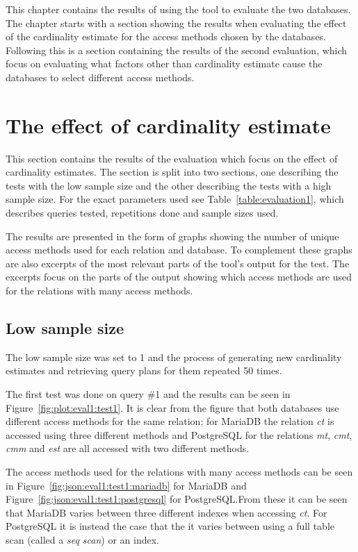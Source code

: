 This chapter contains the results of using the tool to evaluate the two
databases. The chapter starts with a section showing the results when
evaluating the effect of the cardinality estimate for the access methods chosen
by the databases. Following this is a section containing the results of the
second evaluation, which focus on evaluating what factors other than cardinality
estimate cause the databases to select different access methods.

\section{The effect of cardinality estimate}\label{sec:correlation}
This section contains the results of the evaluation which focus on the effect of
cardinality estimates. The section is split into two sections, one describing
the tests with the low sample size and the other describing the tests with a
high sample size. For the exact parameters used see
Table~\ref{table:evaluation1}, which describes queries tested, repetitions done
and sample sizes used.

The results are presented in the form of graphs showing the number of unique
access methods used for each relation and database. To complement these graphs
are also excerpts of the most relevant parts of the tool's output for the test.
The excerpts focus on the parts of the output showing which access methods are
used for the relations with many access methods.

\subsection{Low sample size}
The low sample size was set to 1 and the process of generating new cardinality
estimates and retrieving query plans for them repeated 50 times.

The first test was done on query \#1 and the results can be seen in
Figure~\ref{fig:plot:eval1:test1}. It is clear from the figure that both
databases use different access methods for the same relation; for MariaDB the
relation \textit{ct} is accessed using three different methods and PostgreSQL
for the relations \textit{mt}, \textit{cmt}, \textit{cmm} and \textit{est} are
all accessed with two different methods.

The access methods used for the relations with many access methods can be seen
in Figure~\ref{fig:json:eval1:test1:mariadb} for MariaDB and
Figure~\ref{fig:json:eval1:test1:postgresql} for PostgreSQL.\@ From these
it can be seen that MariaDB varies between three different indexes when
accessing \textit{ct}. For PostgreSQL it is instead the case that the it varies
between using a full table scan (called a \textit{seq scan}) or an index.

